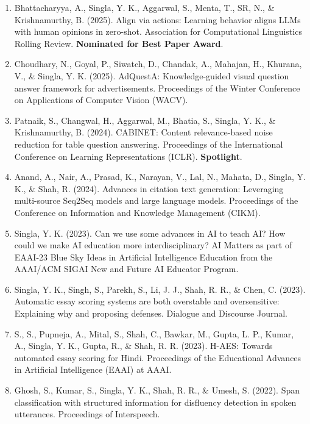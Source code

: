\begin{enumerate}
    \item Bhattacharyya, A., Singla, Y. K., Aggarwal, S., Menta, T., SR, N., \& Krishnamurthy, B. (2025). Align via actions: Learning behavior aligns LLMs with human opinions in zero-shot. Association for Computational Linguistics Rolling Review. \textbf{Nominated for Best Paper Award}.

    \item Choudhary, N., Goyal, P., Siwatch, D., Chandak, A., Mahajan, H., Khurana, V., \& Singla, Y. K. (2025). AdQuestA: Knowledge-guided visual question answer framework for advertisements. Proceedings of the Winter Conference on Applications of Computer Vision (WACV).

    \item Patnaik, S., Changwal, H., Aggarwal, M., Bhatia, S., Singla, Y. K., \& Krishnamurthy, B. (2024). CABINET: Content relevance-based noise reduction for table question answering. Proceedings of the International Conference on Learning Representations (ICLR). \textbf{Spotlight}.

    \item Anand, A., Nair, A., Prasad, K., Narayan, V., Lal, N., Mahata, D., Singla, Y. K., \& Shah, R. (2024). Advances in citation text generation: Leveraging multi-source Seq2Seq models and large language models. Proceedings of the Conference on Information and Knowledge Management (CIKM).

    \item Singla, Y. K. (2023). Can we use some advances in AI to teach AI? How could we make AI education more interdisciplinary? AI Matters as part of EAAI-23 Blue Sky Ideas in Artificial Intelligence Education from the AAAI/ACM SIGAI New and Future AI Educator Program.

    \item Singla, Y. K., Singh, S., Parekh, S., Li, J. J., Shah, R. R., \& Chen, C. (2023). Automatic essay scoring systems are both overstable and oversensitive: Explaining why and proposing defenses. Dialogue and Discourse Journal.

    \item S., S., Pupneja, A., Mital, S., Shah, C., Bawkar, M., Gupta, L. P., Kumar, A., Singla, Y. K., Gupta, R., \& Shah, R. R. (2023). H-AES: Towards automated essay scoring for Hindi. Proceedings of the Educational Advances in Artificial Intelligence (EAAI) at AAAI.

    \item Ghosh, S., Kumar, S., Singla, Y. K., Shah, R. R., \& Umesh, S. (2022). Span classification with structured information for disfluency detection in spoken utterances. Proceedings of Interspeech.


\end{enumerate}
